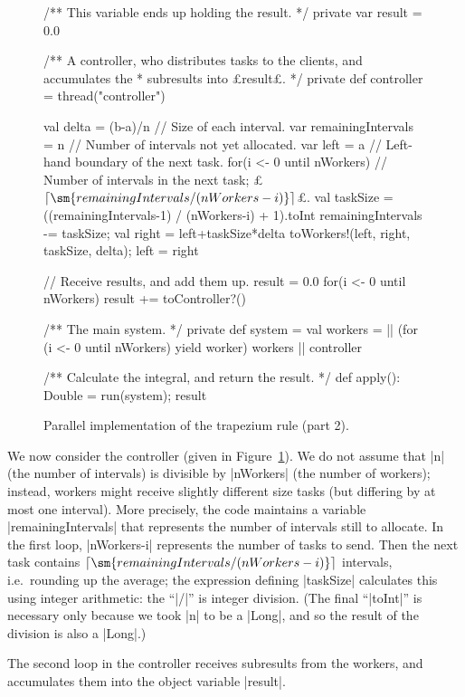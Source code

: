 \begin{figure}
\begin{scala}
  /** This variable ends up holding the result. */
  private var result = 0.0

  /** A controller, who distributes tasks to the clients, and accumulates the
    * subresults into £result£. */
  private def controller = thread("controller"){
    val delta = (b-a)/n    // Size of each interval.
    var remainingIntervals = n    // Number of intervals not yet allocated.
    var left = a // Left-hand boundary of the next task.
    for(i <- 0 until nWorkers){
      // Number of intervals in the next task; £$\lceil \sm{remainingIntervals/(nWorkers-i)} \rceil$£.
      val taskSize = ((remainingIntervals-1) / (nWorkers-i) + 1).toInt
      remainingIntervals -= taskSize; val right = left+taskSize*delta
      toWorkers!(left, right, taskSize, delta); left = right
    }

    // Receive results, and add them up.
    result = 0.0
    for(i <- 0 until nWorkers) result += toController?()
  }    
    
  /** The main system. */
  private def system = {
    val workers = || (for (i <- 0 until nWorkers) yield worker)
    workers || controller
  }

  /** Calculate the integral, and return the result. */
  def apply(): Double = { run(system); result } 
\end{scala}
\caption{Parallel implementation of the trapezium rule (part 2).}
\label{fig:trapezium-2}
\end{figure}


We now consider the controller (given in Figure~\ref{fig:trapezium-2}).  We do
not assume that |n| (the number of intervals) is divisible by |nWorkers| (the
number of workers); instead, workers might receive slightly different size
tasks (but differing by at most one interval).  More precisely, the code
maintains a variable |remainingIntervals| that represents the number of
intervals still to allocate.  In the first loop, |nWorkers-i| represents the
number of tasks to send.  Then the next task contains $\lceil
\sm{remainingIntervals/(nWorkers-i)} \rceil$ intervals, i.e.~rounding up the
average; the expression defining |taskSize| calculates this using integer
arithmetic: the ``|/|'' is integer division.  (The final ``|toInt|'' is
necessary only because we took |n| to be a |Long|, and so the result of the
division is also a |Long|.)

The second loop in the controller receives subresults from the workers, 
and accumulates them into the object variable |result|.

